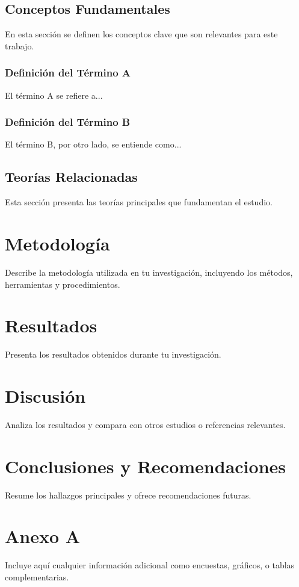 \documentclass[12pt]{report}
\begin{document}
\section{Conceptos Fundamentales}
En esta sección se definen los conceptos clave que son relevantes para este trabajo. 

\subsection{Definición del Término A}
El término A se refiere a...

\subsection{Definición del Término B}
El término B, por otro lado, se entiende como...

\section{Teorías Relacionadas}
Esta sección presenta las teorías principales que fundamentan el estudio.
\chapter{Metodología}
Describe la metodología utilizada en tu investigación, incluyendo los métodos, herramientas y procedimientos.

\chapter{Resultados}
Presenta los resultados obtenidos durante tu investigación.

\chapter{Discusión}
Analiza los resultados y compara con otros estudios o referencias relevantes.

\chapter{Conclusiones y Recomendaciones}
Resume los hallazgos principales y ofrece recomendaciones futuras.




\appendix
\chapter{Anexo A}
Incluye aquí cualquier información adicional como encuestas, gráficos, o tablas complementarias.
\end{document}
